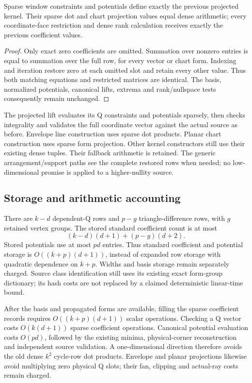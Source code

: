 \begin{proposition}
Sparse window constraints and potentials define exactly the previous
projected kernel. Their sparse dot and chart projection values equal dense
arithmetic; every coordinate-face restriction and dense rank calculation
receives exactly the previous coefficient values.
\end{proposition}
\begin{proof}
Only exact zero coefficients are omitted. Summation over nonzero entries
is equal to summation over the full row, for every vector or chart form.
Indexing and iteration restore zero at each omitted slot and retain every
other value. Thus both matching equations and restricted matrices are
identical. The basis, normalized potentials, canonical lifts, extrema and
rank/nullspace tests consequently remain unchanged.
\end{proof}

The projected lift evaluates its Q constraints and potentials sparsely,
then checks integrality and validates the full coordinate vector against
the actual source as before. Envelope line construction uses sparse dot
products. Planar chart construction uses sparse form projection. Other
kernel constructors still use their existing dense tuples. Their fallback
arithmetic is retained. The generic arrangement/support paths see the
complete restored rows when needed; no low-dimensional promise is applied
to a higher-nullity source.

\subsection{Storage and arithmetic accounting}

There are $k-d$ dependent-Q rows and $p-g$ triangle-difference rows, with
$g$ retained vertex groups. The stored standard coefficient count is at most
\[
          (k-d)(d+1)+(p-g)(d+2).
\]
Stored potentials use at most $pd$ entries. Thus standard coefficient and
potential storage is $O((k+p)(d+1))$, instead of expanded row storage with
quadratic dependence on $k+p$. Widths and basis storage remain separately
charged. Source class identification still uses its existing exact
form-group dictionary; its hash costs are not replaced by a claimed
deterministic linear-time bound.

After the basis and propagated forms are available, filling the sparse
coefficient records requires $O((k+p)(d+1))$ scalar operations. Checking a
Q vector costs $O(k(d+1))$ sparse coefficient operations. Canonical potential
evaluation costs $O(pd)$, followed by the existing minima, physical-corner
reconstruction and independent source validation. A one-dimensional
direction therefore avoids the old dense $k^2$ cycle-row dot products.
Envelope and planar projections likewise avoid multiplying zero physical
Q slots; their fan, clipping and actual-ray costs remain charged.

